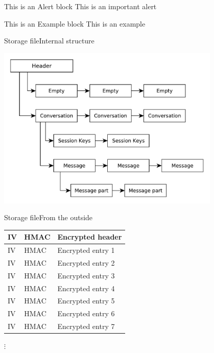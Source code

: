 \documentclass{beamer}
\newcommand{\txtStorageFile}{Storage file}
\begin{document}

\begin{frame}
  
   \begin{alertblock}{This is an Alert block}
   This is an important alert
   \end{alertblock}
 
   \begin{exampleblock}{This is an Example block}
   This is an example 
   \end{exampleblock}
 
\end{frame}


\begin{frame}{\txtStorageFile}{Internal structure}

	\centering
	\includegraphics[width=0.8\textwidth]{storage_file}
\end{frame}

\begin{frame}{\txtStorageFile}{From the outside}

	\begin{tabularx}{\textwidth}{ |l|l|L| }
		\hline
		IV & HMAC & Encrypted header \\
		\hline
		IV & HMAC & Encrypted entry 1 \\
		\hline
		IV & HMAC & Encrypted entry 2 \\
		\hline
		IV & HMAC & Encrypted entry 3 \\
		\hline
		IV & HMAC & Encrypted entry 4 \\
		\hline
		IV & HMAC & Encrypted entry 5 \\
		\hline
		IV & HMAC & Encrypted entry 6 \\
		\hline
		IV & HMAC & Encrypted entry 7 \\
		\hline
	\end{tabularx}

	\centering
	$\vdots$ \\
\end{frame}


\end{document}
